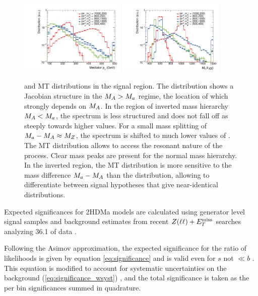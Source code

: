 \begin{figure}
\centering
\includegraphics[width=0.45\textwidth]{texinputs/04_grid/figures/monoz/leptonic/dmwg-final_h_pt_med_dm.pdf}
\includegraphics[width=0.45\textwidth]{texinputs/04_grid/figures/monoz/leptonic/dmwg-final_h_mt_total.pdf}
\caption{\MET and  MT distributions in the signal region. The \MET distribution shows a Jacobian structure in the $M_{A} > M_{a}$ regime, the location of which strongly depends on $M_{A}$. In the region of inverted mass hierarchy $M_{A} < M_{a}$, the spectrum is less structured and does not fall off as steeply towards higher values. For a small mass splitting of $M_{a}-M_{A}\approx M_{Z}$, the spectrum is shifted to much lower values of \MET. The MT distribution allows to access the resonant nature of the process. Clear mass peaks are present for the normal mass hierarchy. In the inverted region, the MT distribution is more sensitive to the mass difference $M_{a}-M_{A}$ than the \MET distribution, allowing to differentiate between signal hypotheses that give near-identical \MET distributions. }
\end{figure}


Expected significances for 2HDMa models are calculated using generator level signal samples and background estimates from recent $Z(\ell \ell) + E_T^\mathrm{miss}$ searches analyzing 36.1 \ifb of data \cite{Aaboud:2017bja}.

Following the Asimov approximation, the expected significance for the ratio of likelihoods is given by equation \ref{eq:significance} and is valid even for $s$ not $\ll b$ \cite{Cowan:2010js}.  
This equation is modified to account for systematic uncertainties on the background (\ref{eq:significance_wsyst}) \cite{Cowan:2012}, and the total significance is taken as the per bin significances summed in quadrature.

